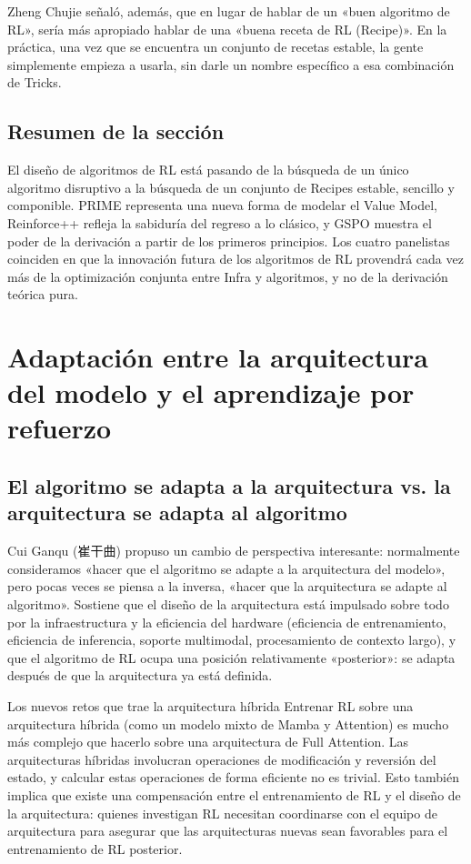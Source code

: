 \documentclass[a4paper]{article}
\begin{document}
Zheng Chujie señaló, además, que en lugar de hablar de un «buen algoritmo de RL», sería más apropiado hablar de una «buena receta de RL (Recipe)». En la práctica, una vez que se encuentra un conjunto de recetas estable, la gente simplemente empieza a usarla, sin darle un nombre específico a esa combinación de Tricks.

\subsection{Resumen de la sección}

El diseño de algoritmos de RL está pasando de la búsqueda de un único algoritmo disruptivo a la búsqueda de un conjunto de Recipes estable, sencillo y componible. PRIME representa una nueva forma de modelar el Value Model, Reinforce++ refleja la sabiduría del regreso a lo clásico, y GSPO muestra el poder de la derivación a partir de los primeros principios. Los cuatro panelistas coinciden en que la innovación futura de los algoritmos de RL provendrá cada vez más de la optimización conjunta entre Infra y algoritmos, y no de la derivación teórica pura.
\section{Adaptación entre la arquitectura del modelo y el aprendizaje por refuerzo}

\subsection{El algoritmo se adapta a la arquitectura vs. la arquitectura se adapta al algoritmo}

Cui Ganqu (崔干曲) propuso un cambio de perspectiva interesante: normalmente consideramos «hacer que el algoritmo se adapte a la arquitectura del modelo», pero pocas veces se piensa a la inversa, «hacer que la arquitectura se adapte al algoritmo». Sostiene que el diseño de la arquitectura está impulsado sobre todo por la infraestructura y la eficiencia del hardware (eficiencia de entrenamiento, eficiencia de inferencia, soporte multimodal, procesamiento de contexto largo), y que el algoritmo de RL ocupa una posición relativamente «posterior»: se adapta después de que la arquitectura ya está definida.

\begin{warningbox}{Los nuevos retos que trae la arquitectura híbrida}
Entrenar RL sobre una arquitectura híbrida (como un modelo mixto de Mamba y Attention) es mucho más complejo que hacerlo sobre una arquitectura de Full Attention. Las arquitecturas híbridas involucran operaciones de modificación y reversión del estado, y calcular estas operaciones de forma eficiente no es trivial. Esto también implica que existe una compensación entre el entrenamiento de RL y el diseño de la arquitectura: quienes investigan RL necesitan coordinarse con el equipo de arquitectura para asegurar que las arquitecturas nuevas sean favorables para el entrenamiento de RL posterior.
\end{warningbox}
\end{document}
